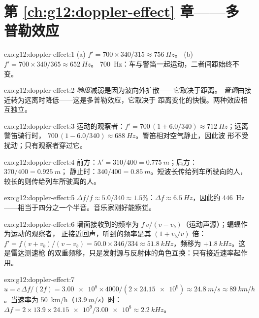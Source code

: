 \section*{第 \ref{ch:g12:doppler-effect} 章——多普勒效应}

\begin{solution}{exo:g12:doppler-effect:1}
(a) $f' = 700 \times 340/315 \approx \qty{756}{Hz}$。
(b) $f' = 700 \times 340/365 \approx \qty{652}{Hz}$。
\qty{700}{Hz}：车与警笛一起运动，二者间距始终不变。
\end{solution}

\begin{solution}{exo:g12:doppler-effect:2}
\emph{响度}减弱是因为波向外扩散——它取决于距离。
\emph{音调}由接近转为远离时降低——这是多普勒效应，它取决于
距离变化的快慢。两种效应相互独立。
\end{solution}

\begin{solution}{exo:g12:doppler-effect:3}
运动的观察者：$f' = 700\,(1 + 6.0/340) \approx \qty{712}{Hz}$；远离警笛骑行时，
$700\,(1 - 6.0/340) \approx \qty{688}{Hz}$。警笛相对空气静止，因此波
形不受扰动；只有观察者穿过它。
\end{solution}

\begin{solution}{exo:g12:doppler-effect:4}
前方：$\lambda' = 310/400 = \qty{0.775}{m}$；后方：$370/400 = \qty{0.925}{m}$；
静止时：$340/400 = \qty{0.85}{m}$。短波长传给列车所驶向的人，
较长的则传给列车所驶离的人。
\end{solution}

\begin{solution}{exo:g12:doppler-effect:5}
$\Delta f/f \approx 5.0/340 \approx 1.5\%$：$\Delta f \approx \qty{6.5}{Hz}$，因此约
\qty{446}{Hz}——相当于四分之一个半音。音乐家刚好能察觉。
\end{solution}

\begin{solution}{exo:g12:doppler-effect:6}
墙面接收到的频率为 $f\,v/(v - v_b)$（运动声源）；蝙蝠作为运动的观察者，
正接近回声，听到的频率是其 $(1 + v_b/v)$ 倍：$f' = f(v + v_b)/(v - v_b) = 50.0 \times
346/334 \approx \qty{51.8}{kHz}$，频移为 $+\qty{1.8}{kHz}$。这是雷达测速枪
的双重频移，只是发射源与反射体的角色互换：只有接近速率起作用。
\end{solution}

\begin{solution}{exo:g12:doppler-effect:7}
$u = c\,\Delta f/(2f) = \num{3.00e8} \times 4000/(2 \times \num{24.15e9}) \approx
\qty{24.8}{m/s} \approx \qty{89}{km/h}$。当速率为 \qty{50}{km/h}（$\qty{13.9}{m/s}$）时：
$\Delta f = 2 \times 13.9 \times \num{24.15e9}/\num{3.00e8} \approx \qty{2.2}{kHz}$。
\end{solution}

